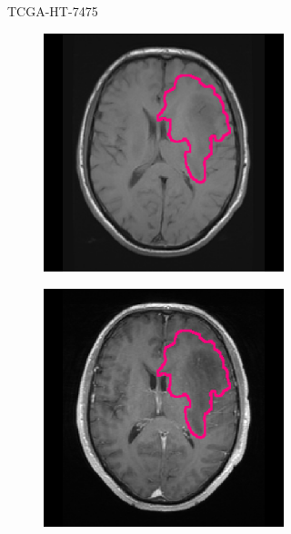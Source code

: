 \begin{subappendices}
\begin{figure}[htbp]
\begin{subfigure}[b]{0.8\textwidth}
\begin{subfigure}[b]{0.215\textwidth}
        \end{subfigure}
        \caption{TCGA-HT-7475}
    \end{subfigure}
    \begin{subfigure}[b]{0.8\textwidth}
        \centering
        \hfill
        \begin{subfigure}[b]{0.215\textwidth}
        \includegraphics[width=\textwidth, clip, trim=2.5cm 0.5cm 2.5cm 0.5cm]{Figures/Random_segs/T1_TCGA-HT-8106.png}
        \end{subfigure}
        \hfill
        \begin{subfigure}[b]{0.215\textwidth}
        \includegraphics[width=\textwidth, clip, trim=2.5cm 0.5cm 2.5cm 0.5cm]{Figures/Random_segs/T1GD_TCGA-HT-8106.png}

\end{subfigure}
\end{subfigure}
\end{figure}
\end{subappendices}
